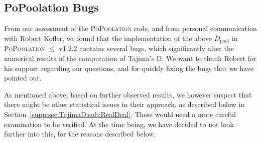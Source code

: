 \documentclass[letterpaper,fontsize=9pt,DIV=12]{scrartcl}
\newcounter{todo}
\newcommand\todo[1]{}
\newcommand\toolname{\textsc}
\newcommand\figref[1]{Figure~\ref{#1}}
\newcommand\eqnref[1]{Eq.~(\ref{#1})}
\newcommand\secref[1]{Section~\ref{#1}}
\newcommand{\readdepth}{c}
\begin{document}
\subsection{PoPoolation Bugs}
\label{supp:sec:TajimaD:sub:Bugs}

From our assessment of the \toolname{PoPoolation} code, and from personal communication with Robert Kofler, we found that the implementation of the above $\tilde{D}_\text{pool}$ in \toolname{PoPoolation} $\leq$ v1.2.2 contains several bugs, which significantly alter the numerical results of the computation of Tajima's D.
We want to thank Robert for his support regarding our questions, and for quickly fixing the bugs that we have pointed out.  

As mentioned above, based on further observed results, we however suspect that there might be other statistical issues in their approach, as described below in \secref{supp:sec:TajimaD:sub:RealDeal}. These would need a more careful examination to be verified. At the time being, we have decided to not look further into this, for the reasons described below.

\todo{important unmentioned and unresolved bugs:  (1) using min b for the n tilde computation seems super wrong as well.  (2) Harmonic numbers appear in the Achaz formulae, but we plug in the “effective” number of individuals which is generally not an integer. But the usual harmonic numbers are defined only for integers.  (3) the last position of a window is accidentally used as the first of the following instead.}

\end{document}
